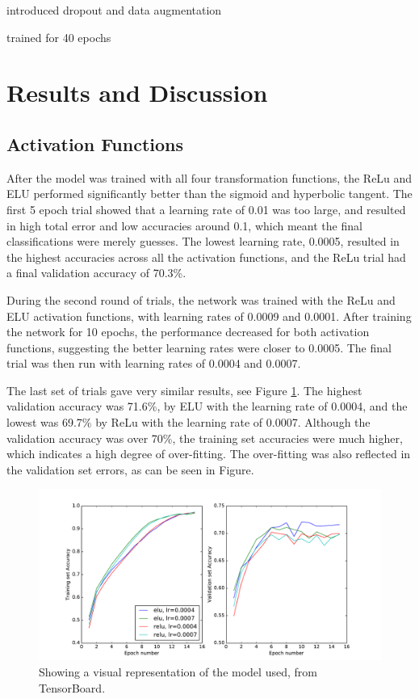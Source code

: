 \documentclass[]{article}
\begin{document}
introduced dropout and data augmentation

trained for 40 epochs
 
 
\section{Results and Discussion}

\subsection{Activation Functions}

After the model was trained with all four transformation functions, the ReLu and ELU performed significantly better than the sigmoid and hyperbolic tangent. The first 5 epoch trial showed that a learning rate of 0.01 was too large, and resulted in high total error and low accuracies around 0.1, which meant the final classifications were merely guesses. The lowest learning rate, 0.0005, resulted in the highest accuracies across all the activation functions, and the ReLu trial had a final validation accuracy of 70.3\%. 

During the second round of trials, the network was trained with the ReLu and ELU activation functions, with learning rates of 0.0009 and 0.0001. After training the network for 10 epochs, the performance decreased for both activation functions, suggesting the better learning rates were closer to 0.0005. The final trial was then run with learning rates of 0.0004 and 0.0007. 

The last set of trials gave very similar results, see Figure \ref{ac_res}. The highest validation accuracy was 71.6\%, by ELU with the learning rate of 0.0004, and the lowest was 69.7\% by ReLu with the learning rate of 0.0007. Although the validation accuracy was over 70\%, the training set accuracies were much higher, which indicates a high degree of over-fitting. The over-fitting was also reflected in the validation set errors, as can be seen in Figure. 

\begin{figure}[h]
	\includegraphics[width=\textwidth]{ac_res}
	\caption{Showing a visual representation of the model used, from TensorBoard.}
	\label{ac_res}
	\centering
\end{figure}
\end{document}
